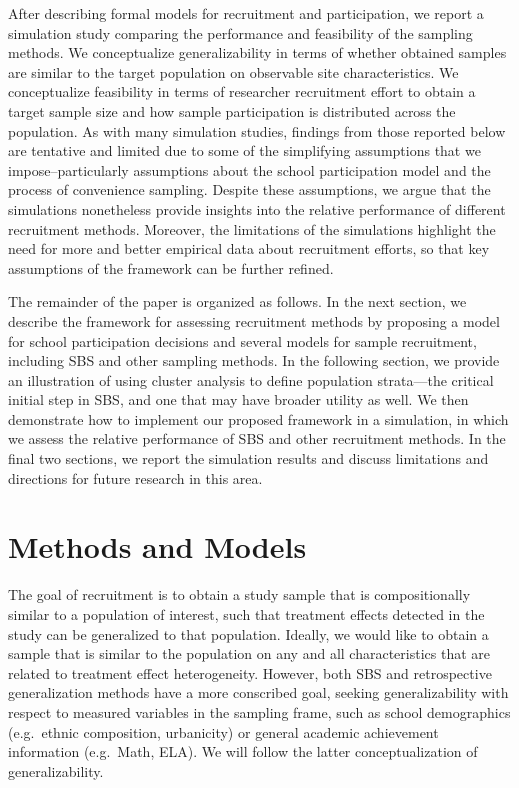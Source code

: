 \documentclass[
  english,
  man,floatsintext]{apa6}
\begin{document}
After describing formal models for recruitment and participation, we report a simulation study comparing the performance and feasibility of the sampling methods. We conceptualize generalizability in terms of whether obtained samples are similar to the target population on observable site characteristics. We conceptualize
feasibility in terms of researcher recruitment effort to obtain a target sample size and how sample participation is distributed across the population.
As with many simulation studies, findings from those reported below are tentative and limited due to some of the simplifying assumptions that we impose--particularly assumptions about the school participation model and the process of convenience sampling.
Despite these assumptions, we argue that the simulations nonetheless provide insights into the relative performance of different recruitment methods.
Moreover, the limitations of the simulations highlight the need for more and better empirical data about recruitment efforts, so that key assumptions of the framework can be further refined.

The remainder of the paper is organized as follows. In the next section, we describe the framework for assessing recruitment methods by proposing a model for school participation decisions and several models for sample recruitment, including SBS and other sampling methods. In the following section, we provide an illustration of using cluster analysis to define population strata---the critical initial step in SBS, and one that may have broader utility as well. We then demonstrate how to implement our proposed framework in a simulation, in which we assess the relative performance of SBS and other recruitment methods. In the final two sections, we report the simulation results and discuss limitations and directions for future research in this area.

\hypertarget{methods-and-models}{%
\section{Methods and Models}\label{methods-and-models}}

The goal of recruitment is to obtain a study sample that is compositionally similar to a population of interest, such that treatment effects detected in the study can be generalized to that population.
Ideally, we would like to obtain a sample that is similar to the population on any and all characteristics that are related to treatment effect heterogeneity.
However, both SBS and retrospective generalization methods have a more conscribed goal, seeking generalizability with respect to measured variables in the sampling frame, such as school demographics (e.g.~ethnic composition, urbanicity) or general academic achievement information (e.g.~Math, ELA).
We will follow the latter conceptualization of generalizability.
\end{document}
